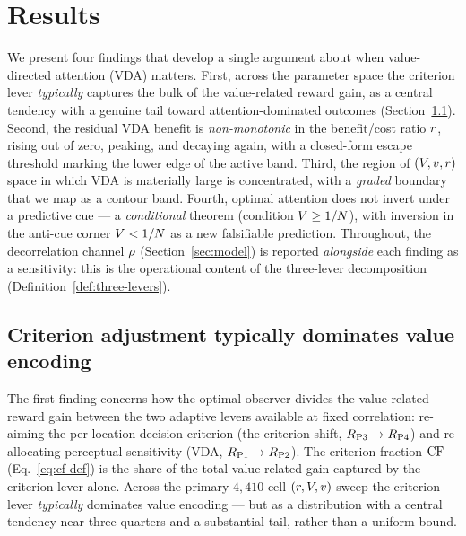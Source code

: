 
\section{Results}
\label{sec:results}

We present four findings that develop a single argument about when
value-directed attention (VDA) matters. First, across the parameter
space the criterion lever \emph{typically} captures the bulk of the
value-related reward gain, as a central tendency with a genuine tail
toward attention-dominated outcomes
(Section~\ref{sec:results-criterion}). Second, the residual VDA benefit
is \emph{non-monotonic} in the benefit/cost ratio $r$, rising out
of zero, peaking, and decaying again, with a closed-form escape
threshold marking the lower edge of the active band. Third, the
region of $(V, v, r)$ space in which VDA is materially
large is concentrated, with a \emph{graded} boundary that we map as a
contour band. Fourth, optimal attention does not invert under a
predictive cue --- a \emph{conditional} theorem
(condition $V \ge 1/N$), with inversion in the anti-cue corner
$V < 1/N$ as a new falsifiable prediction. Throughout,
the decorrelation channel $\rho$ (Section~\ref{sec:model}) is reported
\emph{alongside} each finding as a sensitivity: this is the operational
content of the three-lever decomposition
(Definition~\ref{def:three-levers}).

\subsection{Criterion adjustment typically dominates value encoding}
\label{sec:results-criterion}

The first finding concerns how the optimal observer divides the
value-related reward gain between the two adaptive levers available at
fixed correlation: re-aiming the per-location decision criterion (the
criterion shift, $R_{\mathrm{P3}} \to R_{\mathrm{P4}}$) and re-allocating perceptual
sensitivity (VDA, $R_{\mathrm{P1}} \to R_{\mathrm{P2}}$). The criterion fraction $\mathrm{CF}$
(Eq.~\ref{eq:cf-def}) is the share of the total value-related gain
captured by the criterion lever alone. Across the primary $4{,}410$-cell
$(r, V, v)$ sweep the criterion lever \emph{typically}
dominates value encoding --- but as a distribution with a central
tendency near three-quarters and a substantial tail, rather than a
uniform bound.

